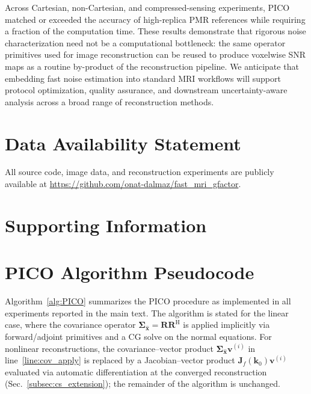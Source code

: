 \documentclass[AMA,STIX2COL,Linenumberson]{MRM}
\begin{document}
Across Cartesian, non-Cartesian, and compressed-sensing 
experiments, PICO matched or exceeded the 
accuracy of high-replica PMR references while requiring a 
fraction of the computation time. These results demonstrate 
that rigorous noise characterization need not be a 
computational bottleneck: the same operator primitives used 
for image reconstruction can be reused to produce voxelwise 
SNR maps as a routine by-product of the reconstruction 
pipeline. We anticipate that embedding fast noise estimation 
into standard MRI workflows will support protocol 
optimization, quality assurance, and downstream 
uncertainty-aware analysis across a broad range of 
reconstruction methods.

\section*{Data Availability Statement}
All source code, image data, and reconstruction experiments are publicly available at \url{https://github.com/onat-dalmaz/fast_mri_gfactor}.

%
\vfill\pagebreak
 
\section*{Supporting Information}
 
\appendix

\section{PICO Algorithm Pseudocode}
\label{app:PICO_algorithm}

Algorithm~\ref{alg:PICO} summarizes the PICO procedure 
as implemented in all experiments reported in the main 
text. The algorithm is stated for the linear case, 
where the covariance operator 
$\boldsymbol{\Sigma}_{\hat{\mathbf{x}}} 
= \mathbf{R}\mathbf{R}^{\mathrm{H}}$ is applied 
implicitly via forward/adjoint primitives and a CG solve 
on the normal equations. For nonlinear reconstructions, 
the covariance--vector product 
$\boldsymbol{\Sigma}_{\hat{\mathbf{x}}}\mathbf{v}^{(i)}$ 
in line~\ref{line:cov_apply} is replaced by a 
Jacobian--vector product 
$\mathbf{J}_f(\mathbf{k}_0)\mathbf{v}^{(i)}$ evaluated 
via automatic differentiation at the converged 
reconstruction (Sec.~\ref{subsec:cs_extension}); the 
remainder of the algorithm is unchanged.
\end{document}
